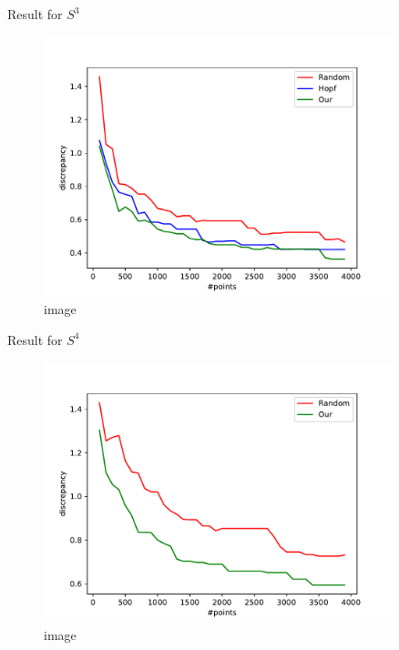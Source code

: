 \begin{frame}{Result for \(S^3\)}
\protect\hypertarget{result-for-s3}{}

\begin{figure}
\centering
\includegraphics[width=0.9\textwidth,height=\textheight]{res_hopf.pdf}
\caption{image}
\end{figure}

\end{frame}

\begin{frame}{Result for \(S^4\)}
\protect\hypertarget{result-for-s4}{}

\begin{figure}
\centering
\includegraphics[width=0.9\textwidth,height=\textheight]{res_S4.pdf}
\caption{image}
\end{figure}

\end{frame}

